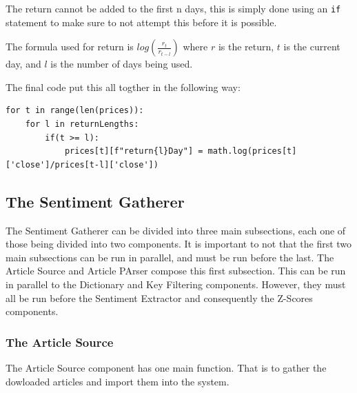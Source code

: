 The return cannot be added to the first n days, this is simply done using an \verb|if| statement to make sure to not attempt this before it is possible.

The formula used for return is $log(\frac{r_t}{r_{t - l}})$ where $r$ is the return, $t$ is the current day, and $l$ is the number of days being used.

The final code put this all togther in the following way:
\begin{lstlisting}[caption=Adding Returns]
for t in range(len(prices)):
    for l in returnLengths:
        if(t >= l):
            prices[t][f"return{l}Day"] = math.log(prices[t]['close']/prices[t-l]['close'])
\end{lstlisting}

\subsection{The Sentiment Gatherer}

The Sentiment Gatherer can be divided into three main subsections, each one of those being divided into two components. It is important to not that the first two main subsections can be run in parallel, and must be run before the last. The Article Source and Article PArser compose this first subsection. This can be run in parallel to the Dictionary and Key Filtering components. However, they must all be run before the Sentiment Extractor and consequently the Z-Scores components.

\subsubsection{The Article Source}

The Article Source component has one main function. That is to gather the dowloaded articles and import them into the system.

